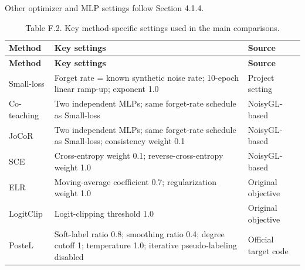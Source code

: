 Other optimizer and MLP settings follow Section 4.1.4.

\begin{longtable}[]{@{}
  >{\raggedright\arraybackslash}p{}
  >{\raggedright\arraybackslash}p{}
  >{\raggedright\arraybackslash}p{}@{}}
\caption{Table F.2. Key method-specific settings used in the main comparisons.}\tabularnewline
\toprule\noalign{}
\begin{minipage}[b]{\linewidth}\raggedright
\textbf{Method}
\end{minipage} & \begin{minipage}[b]{\linewidth}\centering
\textbf{Key settings}
\end{minipage} & \begin{minipage}[b]{\linewidth}\centering
\textbf{Source}
\end{minipage} \\
\midrule\noalign{}
\endfirsthead
\toprule\noalign{}
\begin{minipage}[b]{\linewidth}\raggedright
\textbf{Method}
\end{minipage} & \begin{minipage}[b]{\linewidth}\centering
\textbf{Key settings}
\end{minipage} & \begin{minipage}[b]{\linewidth}\centering
\textbf{Source}
\end{minipage} \\
\midrule\noalign{}
\endhead
\bottomrule\noalign{}
\endlastfoot
Small-loss & Forget rate = known synthetic noise rate; 10-epoch linear ramp-up; exponent 1.0 & Project setting \\
Co-teaching & Two independent MLPs; same forget-rate schedule as Small-loss & NoisyGL-based \\
JoCoR & Two independent MLPs; same forget-rate schedule as Small-loss; consistency weight 0.1 & NoisyGL-based \\
SCE & Cross-entropy weight 0.1; reverse-cross-entropy weight 1.0 & NoisyGL-based \\
ELR & Moving-average coefficient 0.7; regularization weight 1.0 & Original objective \\
LogitClip & Logit-clipping threshold 1.0 & Original objective \\
PosteL & Soft-label ratio 0.8; smoothing ratio 0.4; degree cutoff 1; temperature 1.0; iterative pseudo-labeling disabled & Official target code \\

\end{longtable}
